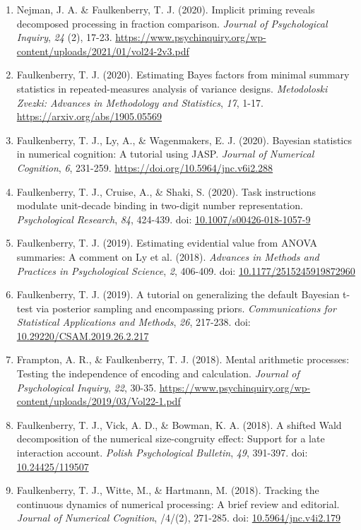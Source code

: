 \documentclass[article,10pt]{article}
\begin{document}
\begin{enumerate}
\item Nejman, J. A. \& Faulkenberry, T. J. (2020). Implicit priming reveals decomposed processing in fraction comparison. \emph{Journal of Psychological Inquiry}, \emph{24} (2), 17-23. \url{https://www.psychinquiry.org/wp-content/uploads/2021/01/vol24-2v3.pdf}
\item Faulkenberry, T. J. (2020). Estimating Bayes factors from minimal summary statistics in repeated-measures analysis of variance designs. \emph{Metodoloski Zvezki: Advances in Methodology and Statistics}, \emph{17}, 1-17.  \url{https://arxiv.org/abs/1905.05569}
\item Faulkenberry, T. J., Ly, A., \& Wagenmakers, E. J. (2020). Bayesian statistics in numerical cognition: A tutorial using JASP. \emph{Journal of Numerical Cognition}, \emph{6}, 231-259. \url{https://doi.org/10.5964/jnc.v6i2.288}
\item Faulkenberry, T. J., Cruise, A., \& Shaki, S. (2020). Task instructions modulate unit-decade binding in two-digit number representation. \emph{Psychological Research}, \emph{84}, 424-439. doi: \href{https://dx.doi.org/10.1007/s00426-018-1057-9}{10.1007/s00426-018-1057-9}
\item Faulkenberry, T. J. (2019). Estimating evidential value from ANOVA summaries: A comment on Ly et al. (2018). \emph{Advances in Methods and Practices in Psychological Science}, \emph{2}, 406-409. doi: \href{https://doi.org/10.1177/2515245919872960}{10.1177/2515245919872960}
\item Faulkenberry, T. J. (2019). A tutorial on generalizing the default Bayesian t-test via posterior sampling and encompassing priors. \emph{Communications for Statistical Applications and Methods}, \emph{26}, 217-238. doi: \href{https://doi.org/10.29220/CSAM.2019.26.2.217}{10.29220/CSAM.2019.26.2.217}
\item Frampton, A. R., \& Faulkenberry, T. J. (2018). Mental arithmetic processes: Testing the independence of encoding and calculation. \emph{Journal of Psychological Inquiry}, \emph{22}, 30-35. \url{https://www.psychinquiry.org/wp-content/uploads/2019/03/Vol22-1.pdf}
\item Faulkenberry, T. J., Vick, A. D., \& Bowman, K. A. (2018). A shifted Wald decomposition of the numerical size-congruity effect: Support for a late interaction account. \emph{Polish Psychological Bulletin}, \emph{49}, 391-397. doi: \href{http://dx.doi.org/10.24425/119507}{10.24425/119507}
\item Faulkenberry, T. J., Witte, M., \& Hartmann, M. (2018). Tracking the continuous dynamics of numerical processing: A brief review and editorial. \emph{Journal of Numerical Cognition}, /4/(2), 271-285. doi: \href{http://dx.doi.org/10.5964/jnc.v4i2.179}{10.5964/jnc.v4i2.179}

\end{enumerate}
\end{document}
